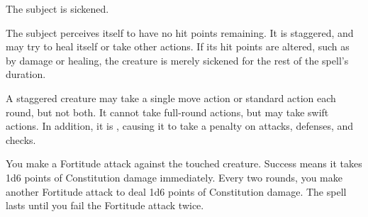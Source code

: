 \spellrng{\rngmed}
\spelldur{\durshort}
\begin{spellhealthy}
    The subject is sickened.
\end{spellhealthy}
\begin{spellblood}
    The subject perceives itself to have no hit points remaining. It is staggered, and may try to heal itself or take other actions. If its hit points are altered, such as by damage or healing, the creature is merely sickened for the rest of the spell's duration.
\end{spellblood}
\begin{spellnotes}
    A staggered creature may take a single move action or standard action each round, but not both. It cannot take full-round actions, but may take swift actions. In addition, it is \vulnerable, causing it to take a  penalty on attacks, defenses, and checks.
\end{spellnotes}

\begin{spelleffect}
    You make a Fortitude attack against the touched creature. Success means it takes 1d6 points of Constitution damage immediately. Every two rounds, you make another Fortitude attack to deal 1d6 points of Constitution damage. The spell lasts until you fail the Fortitude attack twice.
\end{spelleffect}

